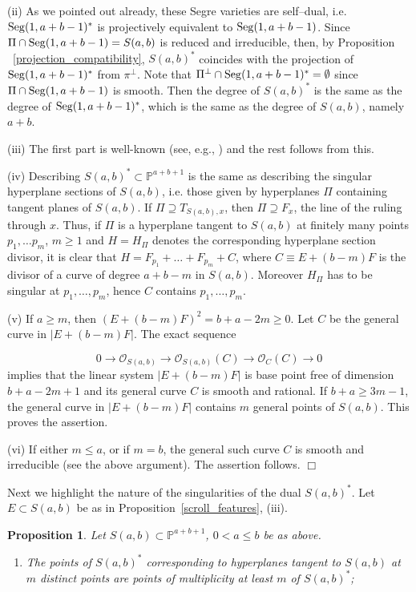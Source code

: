 \documentclass[11pt]{article}   %
\newtheorem{Proposition}[Theorem]{Proposition}
\theoremstyle{definition}
\numberwithin{Theorem}{section} \numberwithin{equation}{section}
\def\QED{\hfill$\Box$}
\def\qed{\QED}
\renewcommand{\O}{{\mathcal O}}
\newcommand{\p}{{\mathbb P}}
\begin{document}
{{(ii)  As we pointed out already,  these Segre varieties are
self--dual, i.e. ${\rm Seg}(1,a+b-1)^ *$ is projectively equivalent
to ${\rm Seg}(1,a+b-1)$. Since $\Pi\cap {\rm Seg}(1,a+b-1)=S(a,b)$
is reduced and irreducible, then, by Proposition ~\ref{projection_compatibility}},
$S(a,b)^ *$ coincides with the projection of ${\rm Seg}(1,a+b-1)^ *$  from $\pi^ \perp$.
Note that $\Pi^\perp\cap
{\rm Seg}(1,a+b-1)^*=\emptyset$ since $\Pi\cap {\rm Seg}(1,a+b-1)$
is smooth.  Then the degree of $S(a,b)^ *$ is
the same as the degree of ${\rm Seg}(1,a+b-1)^ *$, which is the same
as the degree of $S(a,b)$, namely $a+b$.

(iii) The first part is well-known (see, e.g., \cite{EH})  and the
rest follows from this.

(iv) Describing  $S(a,b)^*\subset\p^{a+b+1}$ is the same as
describing the singular hyperplane sections of $S(a,b)$, i.e. those
given by hyperplanes $\Pi$ containing tangent planes of $S(a,b)$. If
$\Pi\supseteq T_{S(a,b),x}$, then $\Pi\supseteq F_x$, the line of
the ruling through $x$. Thus, if  $\Pi$ is a hyperplane tangent to
$S(a,b)$ at finitely many points $p_1,\ldots p_m$, $m\geq 1$ and
$H=H_\Pi$ denotes the corresponding hyperplane section divisor, it
is clear that $H=F_{p_1}+\ldots+ F_{p_m}+ C$, where $C\equiv
E+(b-m)F$ is the divisor of a curve of degree $a+b-m$ in $S(a,b)$.
Moreover $H_\Pi$ has to be singular at $p_1,\dots,p_m$, hence $C$
contains $p_1,\dots,p_m$.

(v) If $a\geq m$, then $(E+(b-m)F)^ 2=b+a-2m\geq 0$. Let $C$ be the
general curve in $| E+(b-m)F| $. The exact sequence

$$0\to \O_{S(a,b)}\to \O_{S(a,b)}(C)\to \O_C(C)\to 0$$
implies that the linear system $|E+(b-m)F| $ is base point free of
dimension $b+a-2m+1$ and its general curve $C$ is smooth and
rational. If $b+a\geq 3m-1$, the general curve in $|E+(b-m)F| $
contains $m$ general points of $S(a,b)$. This proves the assertion.

(vi) If either  $m\leq a$, or if $m=b$, the general such curve $C$
is smooth and irreducible (see the above argument). The assertion
follows. \qed

\bigskip

Next we highlight the nature of the singularities of the dual
$S(a,b)^*$. Let $E\subset S(a,b)$ be as in
Proposition~\ref{scroll_features}, (iii).


\begin{Proposition}\label{sing_of_dual} Let $S(a,b)\subset\p^{a+b+1}$, $0<a\leq b$
be as above.
\begin{enumerate}
\item[{\rm (i)}] The points of $S(a,b)^*$ corresponding to
hyperplanes tangent to $S(a,b)$ at $m$ distinct points are points of
multiplicity at least  $m$ of $S(a,b)^*${\rm ;}


\end{enumerate}
\end{Proposition}}
\end{document}
